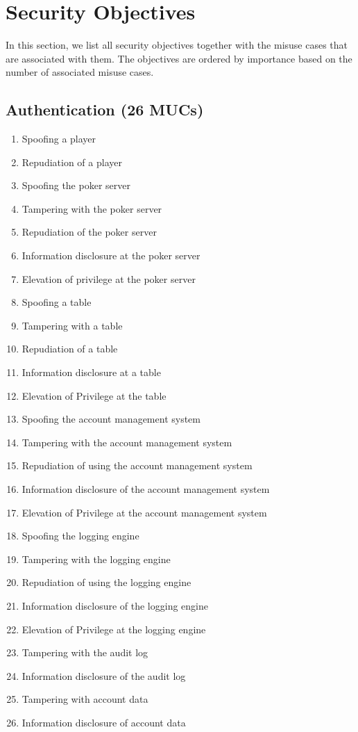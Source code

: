 \documentclass[a4paper,11pt]{report}
\begin{document}
\section{Security Objectives}
\label{MUCLabels}
In this section, we list all security objectives together with the misuse cases that are associated with them. The objectives are ordered by importance based on the number of associated misuse cases.

\subsection{Authentication (26 MUCs)}
\begin{enumerate}
\item Spoofing a player
\item Repudiation of a player
\item Spoofing the poker server
\item Tampering with the poker server
\item Repudiation of the poker server
\item Information disclosure at the poker server
\item Elevation of privilege at the poker server
\item Spoofing a table
\item Tampering with a table
\item Repudiation of a table
\item Information disclosure at a table
\item Elevation of Privilege at the table
\item Spoofing the account management system
\item Tampering with the account management system
\item Repudiation of using the account management system
\item Information disclosure of the account management system
\item Elevation of Privilege at the account management system
\item Spoofing the logging engine
\item Tampering with the logging engine
\item Repudiation of using the logging engine
\item Information disclosure of the logging engine
\item Elevation of Privilege at the logging engine
\item Tampering with the audit log
\item Information disclosure of the audit log
\item Tampering with account data
\item Information disclosure of account data
\end{enumerate}
\end{document}
